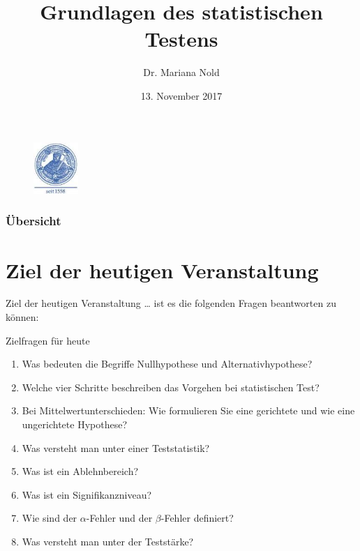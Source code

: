 \documentclass[usenames,dvipsnames,handout]{beamer}
\begin{document}
\author[Dr. Mariana Nold]{Dr. Mariana Nold}
 \date{}
\title [Grundlagen des statistischen Testens]{Grundlagen des statistischen Testens}
\date{13. November 2017}
\begin{frame}
\maketitle

  \begin{figure}[ht]
 	\centering
 	      \includegraphics[width=0.15\textwidth]{index.jpeg}
 	\end{figure}
\end{frame} 

\begin{frame}
  \frametitle{Übersicht}
  \tableofcontents
\end{frame}

\section{Ziel der heutigen Veranstaltung }
\begin{frame}{Ziel der heutigen Veranstaltung \dots}
ist es die folgenden Fragen beantworten zu können:
\begin{block}{Zielfragen für heute}
\begin{enumerate}
\item{Was bedeuten die Begriffe Nullhypothese und Alternativhypothese?}
\item{Welche vier Schritte beschreiben das Vorgehen bei statistischen Test?}
\item{Bei Mittelwertunterschieden: Wie formulieren Sie eine gerichtete und wie eine ungerichtete 
Hypothese?}
\item{Was versteht man unter einer Teststatistik?}
\item{Was ist ein Ablehnbereich?}
\item{Was ist ein Signifikanzniveau?}
\item{Wie sind der $\alpha$-Fehler und der $\beta$-Fehler definiert?}
\item{Was versteht man unter der Teststärke?}
\end{enumerate}
\end{block}
\end{frame}
\end{document}
